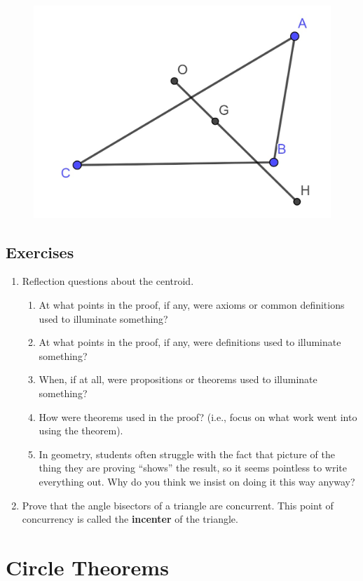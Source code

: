 \documentclass[
]{book}
\providecommand{\tightlist}{%
  \setlength{\itemsep}{0pt}\setlength{\parskip}{0pt}}
\theoremstyle{definition}
\theoremstyle{definition}
\theoremstyle{definition}
\theoremstyle{definition}
\theoremstyle{remark}
\begin{document}
\begin{figure}

{\centering \includegraphics[width=0.3\linewidth]{images/EulerLine} 

}

\end{figure}

\hypertarget{exercises-41}{%
\subsection{Exercises}\label{exercises-41}}

\begin{enumerate}
\def\labelenumi{\arabic{enumi}.}
\item
  Reflection questions about the centroid.

  \begin{enumerate}
  \def\labelenumii{\alph{enumii}.}
  \tightlist
  \item
    At what points in the proof, if any, were axioms or common definitions used to illuminate something?
  \item
    At what points in the proof, if any, were definitions used to illuminate something?
  \item
    When, if at all, were propositions or theorems used to illuminate something?
  \item
    How were theorems used in the proof? (i.e., focus on what work went into using the theorem).
  \item
    In geometry, students often struggle with the fact that picture of the thing they are proving ``shows'' the result, so it seems pointless to write everything out. Why do you think we insist on doing it this way anyway?
  \end{enumerate}
\item
  Prove that the angle bisectors of a triangle are concurrent. This point of concurrency is called the \textbf{incenter} of the triangle.
\end{enumerate}

\hypertarget{circle-theorems}{%
\section{Circle Theorems}\label{circle-theorems}}
\end{document}
